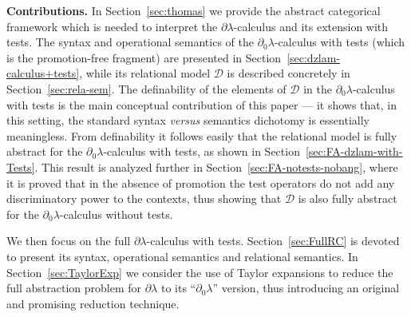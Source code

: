 \documentclass{LMCS}
\newcommand{\dlam}{\ensuremath{\partial\lambda}}
\newcommand{\dzlam}{\ensuremath{\partial_0\lambda}}
\newcommand{\cD}{\mathcal{D}}
\begin{document}
\medskip \textbf{Contributions.}
In Section~\ref{sec:thomas} we provide the abstract categorical framework which is 
needed to interpret the $\dlam$-calculus and its extension with tests.
The syntax and operational semantics of the $\dzlam$-calculus with tests (which is the promotion-free fragment)
are presented in Section~\ref{sec:dzlam-calculus+tests}, while its relational model $\cD$ is described concretely in Section~\ref{sec:rela-sem}.
The definability of the elements of $\cD$ in the \dzlam-calculus with tests is
the main conceptual contribution of this paper --- it shows that, in this setting, the standard syntax \emph{versus} semantics dichotomy is
essentially meaningless.  
From definability it follows easily that the relational model is fully abstract for the $\dzlam$-calculus with tests, as shown in Section~\ref{sec:FA-dzlam-with-Tests}.
This result is analyzed further in Section~\ref{sec:FA-notests-nobang}, where it is proved that in the absence of promotion the test operators do not add any discriminatory 
power to the contexts, thus showing that $\cD$ is also fully abstract for the $\dzlam$-calculus without tests. 

We then focus on the full $\dlam$-calculus with tests.
Section~\ref{sec:FullRC} is devoted to present its syntax, operational
semantics and relational semantics.  In Section~\ref{sec:TaylorExp} we
consider the use of Taylor expansions to reduce the full abstraction
problem for $\dlam$ to its ``\dzlam'' version, thus introducing an
original and promising reduction technique.
 


\renewcommand{\phi}{\varphi}
\renewcommand\epsilon{\varepsilon}
\renewcommand\sharp{\#}
\newcommand\Eqref[1]{(\ref{#1})}

\newcommand{\Iff}{\quad\hbox{iff}\quad}
\newcommand{\Implies}{\Rightarrow}
\newcommand\Equiv{\Leftrightarrow}
\newcommand{\St}{\mid}

\newcommand{\Ro}{\circ}
\newcommand{\Inf}{\bigwedge}
\newcommand{\Infi}{\wedge}
\newcommand{\Sup}{\bigvee}
\newcommand{\Supi}{\vee}


\newcommand{\arrow}{\rightarrow}
\renewcommand{\Bot}{{\mathord{\perp}}}
\newcommand{\Top}{\top}

\newcommand\Seqempty{\langle\rangle}

\newcommand\Fini{{\mathrm{fin}}}



\def\frownsmile{\mathrel{\vbox{\hbox{${\frown}$}\vspace{-2ex}\hbox{${\smile}$}\vspace{-.5ex}}}}
\def\smilefrown{\mathrel{\vbox{\hbox{${\smile}$}\vspace{-2ex}\hbox{${\frown}$}\vspace{-.5ex}}}}
\end{document}
